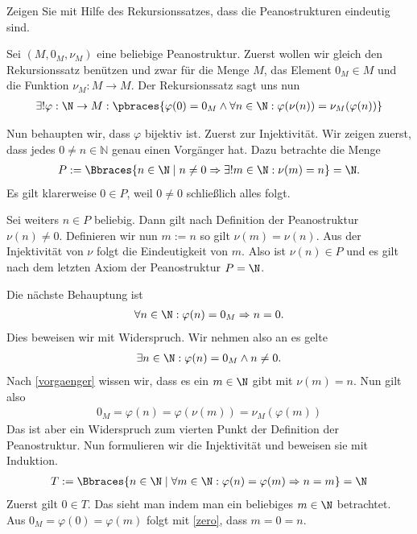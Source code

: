 \begin{exercise}
    Zeigen Sie mit Hilfe des Rekursionssatzes, dass die Peanostrukturen eindeutig sind.
\end{exercise}
\begin{solution}
    Sei $(M,0_M, \nu_M)$ eine beliebige Peanostruktur.
    Zuerst wollen wir gleich den Rekursionssatz benützen und zwar für die Menge $M$, das Element $0_M \in M$ und die Funktion $\nu_M: M \to M$. Der Rekursionssatz sagt uns nun
    \begin{align*}
        \exists! \varphi: \N \to M : \pbraces{\varphi(0) = 0_M \land \forall n \in \N : \varphi(\nu(n)) = \nu_M(\varphi(n))}
    \end{align*}

    Nun behaupten wir, dass $\varphi$ bijektiv ist. Zuerst zur Injektivität.
    Wir zeigen zuerst, dass jedes $ 0 \neq n \in \mathbb{N}$ genau einen Vorgänger hat.
    Dazu betrachte die Menge
    \begin{align}\label{vorgaenger}
       P := \Bbraces{n \in \N \mid n \neq 0 \Rightarrow \exists! m \in \N: \nu(m) = n} = \N.
    \end{align}
    Es gilt klarerweise $0 \in P$, weil $0 \neq 0$ schließlich alles folgt.

    Sei weiters $n \in P$ beliebig. Dann gilt nach Definition der Peanostruktur $\nu(n) \neq 0$. Definieren wir nun $m := n$ so gilt $\nu(m) = \nu(n)$. Aus der Injektivität von $\nu$ folgt die Eindeutigkeit von $m$. Also ist $\nu(n) \in P$ und es gilt nach dem letzten Axiom der Peanostruktur $P = \N$.

    Die nächste Behauptung ist
    \begin{align}\label{zero}
        \forall n \in \N: \varphi(n) = 0_M \Rightarrow n = 0.
    \end{align}
    Dies beweisen wir mit Widerspruch. Wir nehmen also an es gelte
    \begin{align*}
        \exists n \in \N: \varphi(n) = 0_M \land n \neq 0.
    \end{align*}
    Nach \eqref{vorgaenger} wissen wir, dass es ein $m \in \N$ gibt mit $\nu(m) = n$. Nun gilt also
    \begin{align*}
        0_M = \varphi(n) = \varphi(\nu(m)) = \nu_M(\varphi(m))
    \end{align*}
    Das ist aber ein Widerspruch zum vierten Punkt der Definition der Peanostruktur.
    Nun formulieren wir die Injektivität und beweisen sie mit Induktion.
    \begin{align*}
        T:= \Bbraces{n \in \N \mid \forall m \in \N: \varphi(n) = \varphi(m) \Rightarrow n = m} = \N
    \end{align*}
    Zuerst gilt $0 \in T$. Das sieht man indem man ein beliebiges $m \in \N$ betrachtet. Aus $0_M = \varphi(0) = \varphi(m)$ folgt mit \eqref{zero}, dass $m = 0 = n$.


\end{solution}
